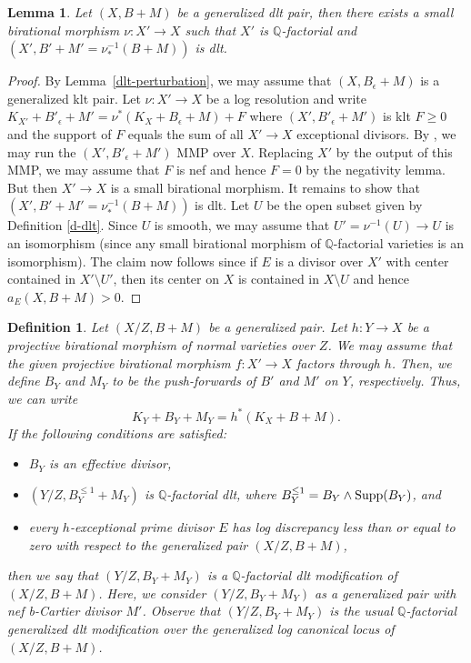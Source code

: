 \documentclass{amsart}
\newcommand{\Q}{\mathbb{Q}}
\renewcommand{\qq}{\mathbb{Q}}
\newtheorem{lemma}[theorem]{Lemma}
\newtheorem{definition}[theorem]{Definition}
\theoremstyle{remark}
\numberwithin{equation}{section}
\begin{document}
\begin{lemma}\label{l-qf} Let $(X,B+M)$  be a generalized dlt pair, then there exists a small birational morphism $\nu:X'\to X$ such that 
$X'$ is $\Q$-factorial and $(X',B'+M'=\nu ^{-1}_*(B+M))$ is dlt.
\end{lemma}
\begin{proof} By Lemma~\ref{dlt-perturbation}, we may assume that $(X ,B_\epsilon +M)$ is a generalized klt pair. Let $\nu :X'\to X$ be a log resolution and write $K_{X'}+B'_\epsilon +M'=\nu^*(K_X+B_\epsilon +M)+F$ where $(X',B'_\epsilon +M')$ is klt $F\geq 0$ and the support of $F$ equals the sum of all $X'\to X$ exceptional divisors. By  \cite[Section 4]{BZ16}, we may run the $({X'},B'_\epsilon +M')$ MMP over $X$. Replacing $X'$ by the output of this MMP, 
we may assume that $F$ is nef and hence $F=0$ by the negativity lemma. But then $X'\to X$ is a small birational morphism. It remains to show that $(X',B'+M'=\nu ^{-1}_*(B+M))$ is dlt. Let $U$ be the open subset given by Definition \ref{d-dlt}. Since $U$ is smooth, we may assume that $U'=\nu ^{-1}(U)\to U$ is an isomorphism (since any small birational morphism of $\Q$-factorial varieties is an isomorphism). The claim now follows since if $E$ is a divisor over $X'$ with center contained in $X'\setminus U'$, then its center on $X$ is contained in $X\setminus U$ and hence $a_E(X,B+M)>0$. 
\end{proof}

\begin{definition}
{\em
Let $(X/Z,B+M)$ be a generalized pair.
Let $h\colon Y \rightarrow X$ be a projective birational morphism of normal varieties over $Z$. 
We may assume that the given projective birational morphism $f\colon X'\rightarrow X$ factors through $h$.
Then, we define $B_Y$ and $M_Y$ to be the push-forwards of $B'$ and $M'$ on $Y$, respectively.
Thus, we can write
\[
K_Y+B_Y+M_Y=h^*(K_X+B+M).
\]
If the following conditions are satisfied:
\begin{itemize}
\item $B_Y$ is an effective divisor, 
\item $(Y/Z,B_Y^{\leq 1}+M_Y)$ is $\qq$-factorial dlt, where $B_Y^{\leq 1}=B_Y\wedge {\rm Supp}(B_Y)$, and
\item every $h$-exceptional prime divisor $E$ has log discrepancy less than or equal to zero with respect
to the generalized pair $(X/Z,B+M)$,
\end{itemize}
then we say that $(Y/Z,B_Y+M_Y)$ is a {\em $\qq$-factorial dlt modification} of $(X/Z,B+M)$.
Here, we consider $(Y/Z,B_Y+M_Y)$ as a generalized pair with nef b-Cartier divisor $M'$.
Observe that $(Y/Z,B_Y+M_Y)$ is the usual $\qq$-factorial generalized dlt modification over 
the generalized log canonical locus of $(X/Z,B+M)$.
}
\end{definition}
\end{document}
